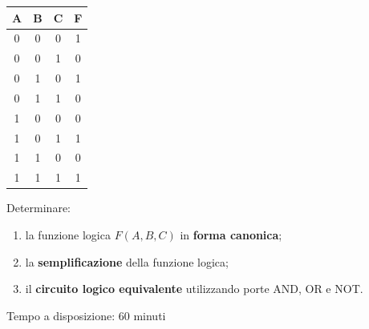 \documentclass[a4paper,12pt]{article}
\begin{document}
	\begin{center}
		
		\begin{tabular}{|c|c|c|c|}
			\hline
			A & B & C & F \\
			\hline
			0 & 0 & 0 & 1 \\
			0 & 0 & 1 & 0 \\
			0 & 1 & 0 & 1 \\
			0 & 1 & 1 & 0 \\
			1 & 0 & 0 & 0 \\
			1 & 0 & 1 & 1 \\
			1 & 1 & 0 & 0 \\
			1 & 1 & 1 & 1 \\
			\hline
		\end{tabular}
		
	\end{center}
	
	Determinare:
	
	\begin{enumerate}
		\item la funzione logica \(F(A,B,C)\) in \textbf{forma canonica};
		\item la \textbf{semplificazione} della funzione logica;
		\item il \textbf{circuito logico equivalente} utilizzando porte AND, OR e NOT.
	\end{enumerate}
	
	\vspace{1cm}
	
	
	Tempo a disposizione: 60 minuti
	
\end{document}
